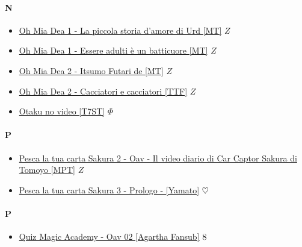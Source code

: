 		\paragraph{N} \hypertarget{ON}{}
			\begin{itemize}
				
				\item \href{https://mega.nz/#!MNIGVBxD!DmC1Y8TpINN1upaWyWjVbcOLsI81ESq8Py9DdzWsohQ} {Oh Mia Dea 1 - La piccola storia d'amore di Urd [MT]} $Z$ \\ 
				\item \href{https://mega.nz/#!lERVVboC!jq_g041_q19X_TLG8EU7ZyH532NtGpeW635-aHgBgtY} {Oh Mia Dea 1 - Essere adulti è un batticuore [MT]} $Z$ \\ 
				\item \href{https://mega.nz/#!xRpT2RwC!6WBUcV-79vg_qaxErSD87f-dvmMVXGejP8yLwGi5RF8} {Oh Mia Dea 2 - Itsumo Futari de [MT]} $Z$ \\ 
				\item \href{https://mega.nz/#!tFJSyRYT!mJ9r9LowJWJUPBFDDiPnJ740SAhh3mQfLU9wg9QHuL0} {Oh Mia Dea 2 - Cacciatori e cacciatori [TTF]} $Z$ \\ 
				\item \href{https://mega.nz/#F!UbYlmSiZ!Zqwgv7wliFg78gLNhqhfDw} {Otaku no video [T7ST]} $\Phi$ \\
				
				
			\end{itemize}
		
		\paragraph{P} \hypertarget{OP}{}
			\begin{itemize}
				
				\item \href{https://mega.nz/#!6vgDjbTK!AkSDjur5IKmQR5Azcb7pSSm0qyfybPusym_xGxysJdg} {Pesca la tua carta Sakura 2 - Oav - Il video diario di Car Captor Sakura di Tomoyo [MPT]} $Z$ \\ 
				\item \href{https://mega.nz/#!XzZ3wY4Q!WnODacZ9hTHGX0e3LSgqiIh3EDbdIvh1yR_2AI3O9YI} {Pesca la tua carta Sakura 3 - Prologo -  [Yamato]} $\heartsuit$ \\ 
				
			\end{itemize}
		
		\paragraph{P} \hypertarget{OP}{}
			\begin{itemize}
				
				\item \href{https://mega.nz/#!CrJh3SpL!nr_saL1lM8Atc33pAwjckfSK7God-Nuzgk5t33SShyo} {Quiz Magic Academy - Oav 02 [Agartha Fansub]} $\oldstylenums{8}$ \\ 
				
			\end{itemize}
			
